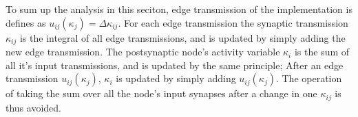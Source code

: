 
			To sum up the analysis in this seciton, edge transmission of the implementation is defines as  $u_{ij}(\kappa_j) = \Delta \kappa_{ij}$.
			For each edge transmission the synaptic transmission $\kappa_{ij}$ is the integral of all edge transmissions, and is updated by simply adding the new edge transmission.
			The postsynaptic node's activity variable $\kappa_i$ is the sum of all it's input transmissions, and is updated by the same principle; %
				After an edge transmission $u_{ij}(\kappa_j)$, $\kappa_i$ is updated by simply adding $u_{ij}(\kappa_j)$. 
			 The operation of taking the sum over all the node's input synapses after a change in one $\kappa_{ij}$ is thus avoided.

			




